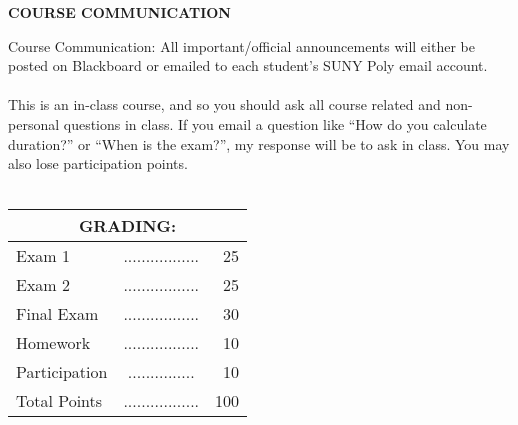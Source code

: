 \documentclass{article}
\begin{document}
\begin{center}
{\bf COURSE COMMUNICATION}
\end{center}
Course Communication: All important/official announcements will either be posted on Blackboard
or emailed to each student's SUNY Poly email account.\\
\\
This is an in-class course, and so you should ask all course related and non-personal questions in class.  If you email a question like ``How do you calculate duration?'' or ``When is the exam?'', my response will be to ask in class.  You may also lose participation points.\\
\\
\begin{center}
\begin{tabular}{lcr}
\multicolumn{3}{c}{\bf GRADING:} \\ \hline
Exam 1 & ................. & 25 \\

Exam 2 & ................. & 25 \\

Final Exam & ................. & 30 \\

Homework & ................. & 10 \\

Participation & ............... &  10\\
  



Total Points & ................. & 100\\
\end{tabular}
\end{center}
\end{document}
